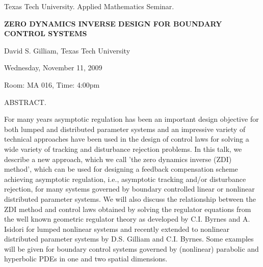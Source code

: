 \documentclass[oneside]{amsart}
\newcommand{\talktitle}{\uppercase{Zero Dynamics Inverse Design for Boundary Control Systems}}
\newcommand{\talkspeaker}{David S. Gilliam, Texas Tech University}
\newcommand{\talkdate}{Wednesday, November 11, 2009}
\newcommand{\talkabstract}{
For many years asymptotic regulation has been an important design
objective for both lumped and distributed parameter systems and an
impressive variety of technical approaches have been used in the
design of control laws for solving a wide variety of tracking and
disturbance rejection problems. In this talk, we describe a new
approach,  which we call 'the zero dynamics inverse (ZDI) method',
which can be used for designing a feedback compensation scheme
achieving asymptotic regulation, i.e., asymptotic tracking and/or
disturbance rejection, for many systems governed by boundary
controlled linear or nonlinear distributed parameter systems.  We will
also discuss the relationship between the ZDI method and control laws
obtained  by solving the regulator equations from the well known
geometric regulator theory as developed by C.I. Byrnes and A. Isidori
for lumped nonlinear systems and recently extended to nonlinear
distributed parameter systems by D.S. Gilliam and C.I. Byrnes. Some
examples will be given for  boundary control systems governed by
(nonlinear) parabolic and hyperbolic PDEs in one and two spatial
dimensions.
}
\begin{document}
\thispagestyle{empty}

\begin{center}
Texas Tech University.  Applied Mathematics Seminar.

\end{center}

\begin{center}

\textbf{\LARGE \talktitle}

\talkspeaker

\talkdate

Room: MA 016, Time: 4:00pm

\end{center}

ABSTRACT.
\talkabstract
\end{document}
